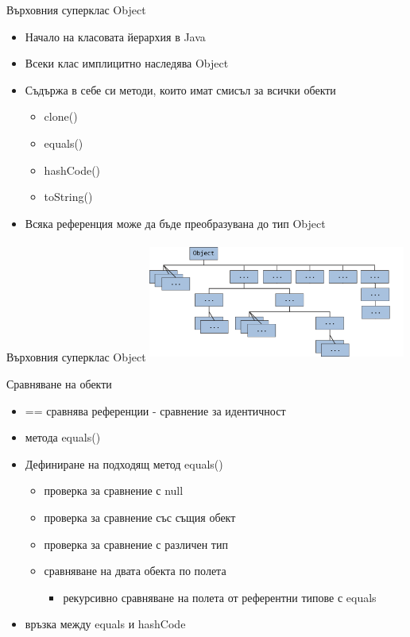 \documentclass{beamer}
\begin{document}
\begin{frame}{Върховния суперклас Object}
  \transdissolve
  \begin{itemize}
  \item Начало на класовата йерархия в Java \pause
  \item Всеки клас имплицитно наследява Object \pause
  \item Съдържа в себе си методи, които имат смисъл за всички обекти
    \begin{itemize}
      \item clone()
      \item equals()
      \item hashCode()
      \item toString()
    \end{itemize}
  \item Всяка референция може да бъде преобразувана до тип Object \pause
  \end{itemize}
\end{frame}

\begin{frame}{Върховния суперклас Object}
  \transdissolve
  \includegraphics[width=320px, height=150px]{images/classes-object.png}
\end{frame}

\begin{frame}{Сравняване на обекти}
  \transdissolve
  \begin{itemize}
  \item == сравнява референции - сравнение за идентичност \pause
  \item метода equals() \pause
  \item Дефиниране на подходящ метод equals() \pause
    \begin{itemize}
      \item проверка за сравнение с null \pause
      \item проверка за сравнение със същия обект \pause
      \item проверка за сравнение с различен тип \pause
      \item сравняване на двата обекта по полета \pause
      \begin{itemize}
        \item рекурсивно сравняване на полета от референтни типове с equals
      \end{itemize}
    \end{itemize}
  \item връзка между equals и hashCode \pause
  \end{itemize}
\end{frame}
\end{document}
